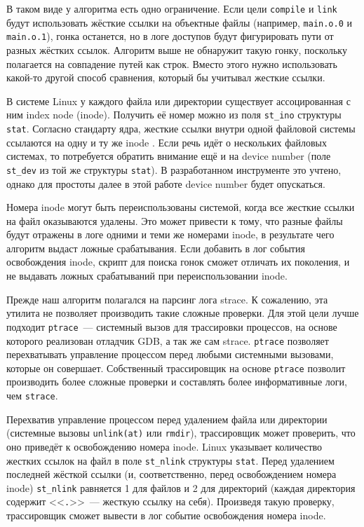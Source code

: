В таком виде у алгоритма есть одно ограничение. Если цели \texttt{compile} и \texttt{link} будут использовать жёсткие ссылки на объектные файлы (например, \texttt{main.o.0} и \texttt{main.o.1}), гонка останется, но в логе доступов будут фигурировать пути от разных жёстких ссылок. Алгоритм выше не обнаружит такую гонку, поскольку полагается на совпадение путей как строк. Вместо этого нужно использовать какой-то другой способ сравнения, который бы учитывал жесткие ссылки.

В системе Linux у каждого файла или директории существует ассоцированная с ним index node (inode). Получить её номер можно из поля \texttt{st\_ino} структуры \texttt{stat}. Согласно стандарту ядра, жесткие ссылки внутри одной файловой системы ссылаются на одну и ту же inode \cite{inode-docs}. Если речь идёт о нескольких файловых системах, то потребуется обратить внимание ещё и на device number (поле \texttt{st\_dev} из той же структуры \texttt{stat}). В разработанном инструменте это учтено, однако для простоты далее в этой работе device number будет опускаться.

Номера inode могут быть переиспользованы системой, когда все жесткие ссылки на файл оказываются удалены. Это может привести к тому, что разные файлы будут отражены в логе одними и теми же номерами inode, в результате чего алгоритм выдаст ложные срабатывания. Если добавить в лог события освобождения inode, скрипт для поиска гонок сможет отличать их поколения, и не выдавать ложных срабатываний при переиспользовании inode.

Прежде наш алгоритм полагался на парсинг лога strace. К сожалению, эта утилита не позволяет производить такие сложные проверки. Для этой цели лучше подходит \texttt{ptrace}~--- системный вызов для трассировки процессов, на основе которого реализован отладчик GDB, а так же сам strace. \texttt{ptrace} позволяет перехватывать управление процессом перед любыми системными вызовами, которые он совершает. Собственный трассировщик на основе \texttt{ptrace} позволит производить более сложные проверки и составлять более информативные логи, чем \texttt{strace}.

Перехватив управление процессом перед удалением файла или директории (системные вызовы \texttt{unlink(at)} или \texttt{rmdir}), трассировщик может проверить, что оно приведёт к освобождению номера inode. Linux указывает количество жестких ссылок на файл в поле \texttt{st\_nlink} структуры \texttt{stat}. Перед удалением последней жёсткой ссылки (и, соответственно, перед освобождением номера inode) \texttt{st\_nlink} равняется 1 для файлов и 2 для директорий (каждая директория содержит <<\texttt{.}>>~--- жесткую ссылку на себя). Произведя такую проверку, трассировщик сможет вывести в лог событие освобождения номера inode.

